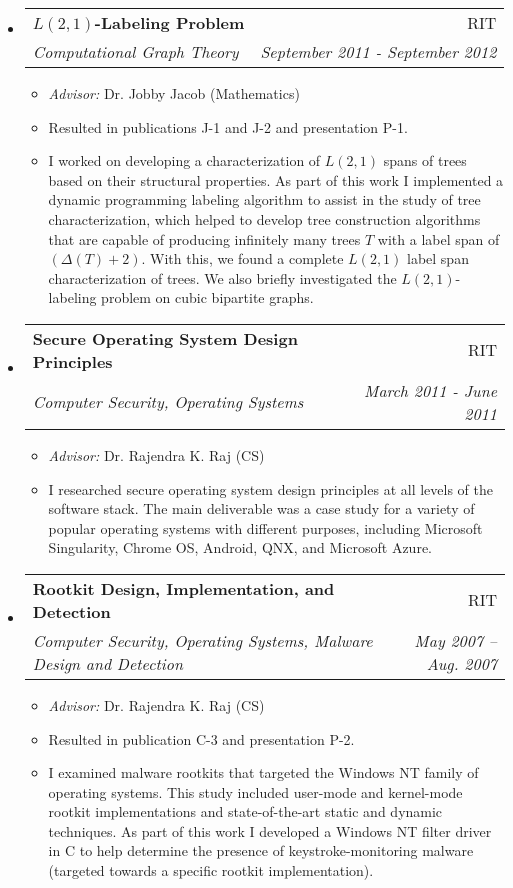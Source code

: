 \documentclass[letterpaper,11pt]{article}
\makeatletter
\newcommand{\resitem}[1]{\item #1 \vspace{-2pt}}
\newcommand{\ressubheading}[4]{
\begin{tabular*}{6.5in}[t]{l@{\cftdotfill{\cftsecdotsep}\extracolsep{\fill}}r}
		\textbf{#1} & #2 \\
		\textit{#3} & \textit{#4} \\
\end{tabular*}\vspace{-6pt}}
\makeatother
\begin{document}
\begin{itemize}
\item
	\ressubheading{$L(2,1)$-Labeling Problem}{RIT}{Computational Graph Theory}{September 2011 - September 2012}
	\begin{itemize}
		\resitem{\emph{Advisor:} Dr. Jobby Jacob (Mathematics)}
		\resitem{Resulted in publications J-1 and J-2 and presentation P-1.}
		\resitem{I worked on developing a characterization of $L(2,1)$ spans of trees based on their structural properties. As part of this work I implemented a dynamic programming labeling algorithm to assist in the study of tree characterization, which helped to develop tree construction algorithms that are capable of producing infinitely many trees $T$ with a label span of $(\Delta(T) + 2)$. With this, we found a complete $L(2,1)$ label span characterization of trees. We also briefly investigated the $L(2,1)$-labeling problem on cubic bipartite graphs.}
	\end{itemize}

\item
	\ressubheading{Secure Operating System Design Principles}{RIT}{Computer Security, Operating Systems}{March 2011 - June 2011}
	\begin{itemize}
		\resitem{\emph{Advisor:} Dr. Rajendra K. Raj (CS)}
		\resitem{I researched secure operating system design principles at all levels of the software stack. The main deliverable was a case study for a variety of popular operating systems with different purposes, including Microsoft Singularity, Chrome OS, Android, QNX, and Microsoft Azure.}
	\end{itemize}

\item
	\ressubheading{Rootkit Design, Implementation, and Detection}{RIT}{Computer Security, Operating Systems, Malware Design and Detection}{May 2007 -- Aug. 2007}
	\begin{itemize}
		\resitem{\emph{Advisor:} Dr. Rajendra K. Raj (CS)}
		\resitem{Resulted in publication C-3 and presentation P-2.}
		\resitem{I examined malware rootkits that targeted the Windows NT family of operating systems. This study included user-mode and kernel-mode rootkit implementations and state-of-the-art static and dynamic techniques. As part of this work I developed a Windows NT filter driver in C to help determine the presence of keystroke-monitoring malware (targeted towards a specific rootkit implementation).}
	\end{itemize}

\end{itemize}
\vspace*{-16pt}
\end{document}
